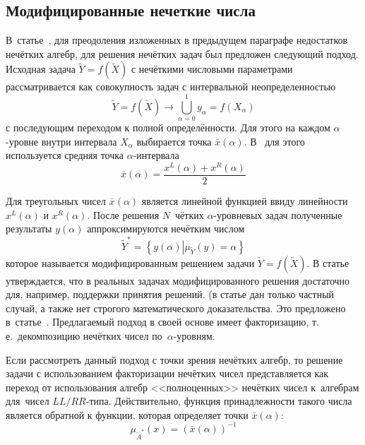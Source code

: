 \subsection{Модифицированные нечеткие числа}

В~статье~\cite{Lebedev}, для преодоления изложенных в предыдущем параграфе недостатков нечётких алгебр, для решения нечётких задач был предложен следующий подход. Исходная задача $\tilde{Y}=f\left( {\tilde{X}} \right)$ с нечёткими числовыми параметрами рассматривается как совокупность задач с интервальной неопределенностью
\begin{equation}
\label{eq:alpha-equivalence}
	\tilde{Y} = f\left( \tilde X \right)\to \bigcup\limits_{\alpha =0}^{1}{y_\alpha}=f\left( X_\alpha \right)
\end{equation}
с последующим переходом к полной определённости. Для этого на каждом $\alpha$-уровне внутри интервала $X_\alpha$ выбирается точка $\bar{x}\left( \alpha  \right)$. В~\cite{Lebedev} для этого используется средняя точка $\alpha$-интервала
\begin{equation}
  \label{eq:L-transform-midpoint}
  \overline{x}\left( \alpha  \right)=\frac{x^L\left( \alpha  \right)+x^R\left( \alpha  \right)}{2}
\end{equation}

Для треугольных чисел $\bar{x}\left( \alpha  \right)$ является линейной функцией ввиду линейности $x^L\left( \alpha  \right)$ и $x^R\left( \alpha  \right)$. После решения $N$~чётких $\alpha $-уровневых задач полученные результаты $y\left( \alpha  \right)$ аппроксимируются нечётким числом
\begin{equation*}
  \tilde Y^{*}=\left\{ y(\alpha )\left| \mu_{\tilde Y}(y)=\alpha \right. \right\}
\end{equation*}
которое называется модифицированным решением задачи $\tilde{Y}=f\left( \tilde X \right)$. В статье утверждается, что в реальных задачах модифицированного решения достаточно для, например, поддержки принятия решений. (в статье дан только частный случай, а также нет строгого математического доказательства. Это предложено в~статье~\cite{Vorontsov_PI}. Предлагаемый подход в своей основе имеет факторизацию, т.\,е.~декомпозицию нечётких чисел по~$\alpha$-уровням.

Если рассмотреть данный подход с точки зрения нечётких алгебр, то решение задачи с использованием факторизации нечётких чисел представляется как переход от использования алгебр <<полноценных>> нечётких чисел к~алгебрам для~чисел $LL/RR$-типа. Действительно, функция принадлежности такого числа является обратной к функции, которая определяет точки $\bar{x}\left( \alpha  \right)$:
\begin{equation}
\label{eq:modified-inverse-function}
  \mu_{\tilde A^{*}}\left( x \right)={\left( \bar{x}\left( \alpha  \right) \right)}^{-1}
\end{equation}

